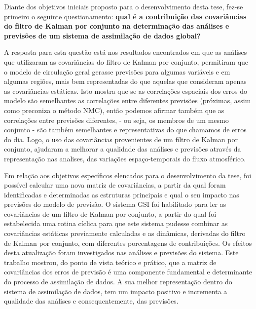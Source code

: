 Diante dos objetivos iniciais proposto para o desenvolvimento desta tese, fez-se primeiro o seguinte questionamento: \textbf{qual é a contribuição das covariâncias do filtro de Kalman por conjunto na determinação das análises e previsões de um sistema de assimilação de dados global?} 

A resposta para esta questão está nos resultados encontrados em que as análises que utilizaram as covariâncias do filtro de Kalman por conjunto, permitiram que o modelo de circulação geral gerasse previsões para algumas variáveis e em algumas regiões, mais bem representadas do que aquelas que consideram apenas as covariâncias estáticas. Isto mostra que se as correlações espaciais dos erros do modelo são semelhantes as correlações entre diferentes previsões (próximas, assim como preconiza o método NMC), então podemos afirmar também que as correlações entre previsões diferentes, - ou seja, os membros de um mesmo conjunto - são também semelhantes e representativas do que chamamos de erros do dia. Logo, o uso das covariâncias provenientes de um filtro de Kalman por conjunto, ajudaram a melhorar a qualidade das análises e previsões através da representação nas analises, das variações espaço-temporais do fluxo atmosférico.

Em relação aos objetivos específicos elencados para o desenvolvimento da tese, foi possível calcular uma nova matriz de covariâncias, a partir da qual foram identificadas e determinadas as estruturas principais e qual o seu impacto nas previsões do modelo de previsão. O sistema GSI foi habilitado para ler as covariâncias de um filtro de Kalman por conjunto, a partir do qual foi estabelecida uma rotina cíclica para que este sistema pudesse combinar as covariâncias estáticas previamente calculadas e as dinâmicas, derivadas do filtro de Kalman por conjunto, com diferentes porcentagens de contribuições. Os efeitos desta atualização foram investigados nas análises e previsões do sistema. Este trabalho mostrou, do ponto de vista teórico e prático, que a matriz de covariâncias dos erros de previsão é uma componente fundamental e determinante do processo de assimilação de dados. A sua melhor representação dentro do sistema de assimilação de dados, tem um impacto positivo e incrementa a qualidade das análises e consequentemente, das previsões. 


